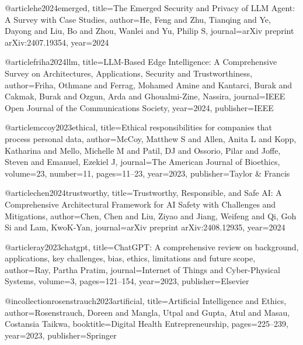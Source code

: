 @article{he2024emerged,
  title={The Emerged Security and Privacy of LLM Agent: A Survey with Case Studies},
  author={He, Feng and Zhu, Tianqing and Ye, Dayong and Liu, Bo and Zhou, Wanlei and Yu, Philip S},
  journal={arXiv preprint arXiv:2407.19354},
  year={2024}
}

@article{friha2024llm,
  title={LLM-Based Edge Intelligence: A Comprehensive Survey on Architectures, Applications, Security and Trustworthiness},
  author={Friha, Othmane and Ferrag, Mohamed Amine and Kantarci, Burak and Cakmak, Burak and Ozgun, Arda and Ghoualmi-Zine, Nassira},
  journal={IEEE Open Journal of the Communications Society},
  year={2024},
  publisher={IEEE}
}

@article{mccoy2023ethical,
  title={Ethical responsibilities for companies that process personal data},
  author={McCoy, Matthew S and Allen, Anita L and Kopp, Katharina and Mello, Michelle M and Patil, DJ and Ossorio, Pilar and Joffe, Steven and Emanuel, Ezekiel J},
  journal={The American Journal of Bioethics},
  volume={23},
  number={11},
  pages={11--23},
  year={2023},
  publisher={Taylor \& Francis}
}

@article{chen2024trustworthy,
  title={Trustworthy, Responsible, and Safe AI: A Comprehensive Architectural Framework for AI Safety with Challenges and Mitigations},
  author={Chen, Chen and Liu, Ziyao and Jiang, Weifeng and Qi, Goh Si and Lam, KwoK-Yan},
  journal={arXiv preprint arXiv:2408.12935},
  year={2024}
}

@article{ray2023chatgpt,
  title={ChatGPT: A comprehensive review on background, applications, key challenges, bias, ethics, limitations and future scope},
  author={Ray, Partha Pratim},
  journal={Internet of Things and Cyber-Physical Systems},
  volume={3},
  pages={121--154},
  year={2023},
  publisher={Elsevier}
}

@incollection{rosenstrauch2023artificial,
  title={Artificial Intelligence and Ethics},
  author={Rosenstrauch, Doreen and Mangla, Utpal and Gupta, Atul and Masau, Costansia Taikwa},
  booktitle={Digital Health Entrepreneurship},
  pages={225--239},
  year={2023},
  publisher={Springer}
}